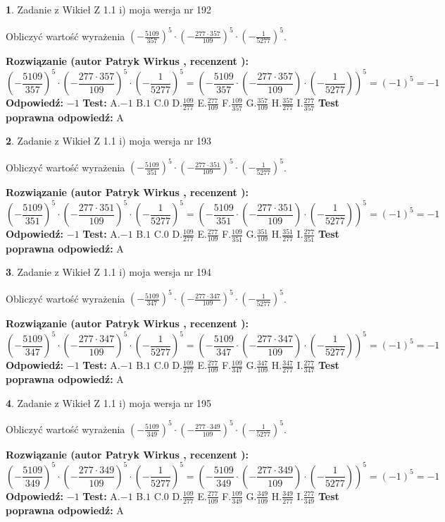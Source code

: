\documentclass[12pt, a4paper]{article}
\theoremstyle{definition} %
\newtheorem{zad}{}
\newcommand{\zadStart}[1]{\begin{zad}#1\newline}
\newcommand{\zadStop}{\end{zad}}
\newcommand{\rozwStart}[2]{\noindent \textbf{Rozwiązanie (autor #1 , recenzent #2): }\newline}
\newcommand{\rozwStop}{\newline}
\newcommand{\odpStart}{\noindent \textbf{Odpowiedź:}\newline}
\newcommand{\odpStop}{\newline}
\newcommand{\testStart}{\noindent \textbf{Test:}\newline}
\newcommand{\testStop}{\newline}
\newcommand{\kluczStart}{\noindent \textbf{Test poprawna odpowiedź:}\newline}
\newcommand{\kluczStop}{\newline}
\begin{document}
\zadStart{Zadanie z Wikieł Z 1.1 i) moja wersja nr 192}

Obliczyć wartość wyrażenia $(-\frac{5109}{357})^{5} \cdot (-\frac{277 \cdot 357}{109})^{5} \cdot (-\frac{1}{5277})^{5}$.
\zadStop
\rozwStart{Patryk Wirkus}{}
$$(-\frac{5109}{357})^{5} \cdot (-\frac{277 \cdot 357}{109})^{5} \cdot (-\frac{1}{5277})^{5} = (-\frac{5109}{357} \cdot (-\frac{277 \cdot 357}{109}) \cdot (-\frac{1}{5277}))^{5} = (-1)^{5} = -1$$
\rozwStop
\odpStart
$-1$
\odpStop
\testStart
A.$-1$ B.$1$ C.$0$ D.$\frac{109}{277}$ E.$\frac{277}{109}$
F.$\frac{109}{357}$ G.$\frac{357}{109}$
H.$\frac{357}{277}$
I.$\frac{277}{357}$
\testStop
\kluczStart
A
\kluczStop



\zadStart{Zadanie z Wikieł Z 1.1 i) moja wersja nr 193}

Obliczyć wartość wyrażenia $(-\frac{5109}{351})^{5} \cdot (-\frac{277 \cdot 351}{109})^{5} \cdot (-\frac{1}{5277})^{5}$.
\zadStop
\rozwStart{Patryk Wirkus}{}
$$(-\frac{5109}{351})^{5} \cdot (-\frac{277 \cdot 351}{109})^{5} \cdot (-\frac{1}{5277})^{5} = (-\frac{5109}{351} \cdot (-\frac{277 \cdot 351}{109}) \cdot (-\frac{1}{5277}))^{5} = (-1)^{5} = -1$$
\rozwStop
\odpStart
$-1$
\odpStop
\testStart
A.$-1$ B.$1$ C.$0$ D.$\frac{109}{277}$ E.$\frac{277}{109}$
F.$\frac{109}{351}$ G.$\frac{351}{109}$
H.$\frac{351}{277}$
I.$\frac{277}{351}$
\testStop
\kluczStart
A
\kluczStop



\zadStart{Zadanie z Wikieł Z 1.1 i) moja wersja nr 194}

Obliczyć wartość wyrażenia $(-\frac{5109}{347})^{5} \cdot (-\frac{277 \cdot 347}{109})^{5} \cdot (-\frac{1}{5277})^{5}$.
\zadStop
\rozwStart{Patryk Wirkus}{}
$$(-\frac{5109}{347})^{5} \cdot (-\frac{277 \cdot 347}{109})^{5} \cdot (-\frac{1}{5277})^{5} = (-\frac{5109}{347} \cdot (-\frac{277 \cdot 347}{109}) \cdot (-\frac{1}{5277}))^{5} = (-1)^{5} = -1$$
\rozwStop
\odpStart
$-1$
\odpStop
\testStart
A.$-1$ B.$1$ C.$0$ D.$\frac{109}{277}$ E.$\frac{277}{109}$
F.$\frac{109}{347}$ G.$\frac{347}{109}$
H.$\frac{347}{277}$
I.$\frac{277}{347}$
\testStop
\kluczStart
A
\kluczStop



\zadStart{Zadanie z Wikieł Z 1.1 i) moja wersja nr 195}

Obliczyć wartość wyrażenia $(-\frac{5109}{349})^{5} \cdot (-\frac{277 \cdot 349}{109})^{5} \cdot (-\frac{1}{5277})^{5}$.
\zadStop
\rozwStart{Patryk Wirkus}{}
$$(-\frac{5109}{349})^{5} \cdot (-\frac{277 \cdot 349}{109})^{5} \cdot (-\frac{1}{5277})^{5} = (-\frac{5109}{349} \cdot (-\frac{277 \cdot 349}{109}) \cdot (-\frac{1}{5277}))^{5} = (-1)^{5} = -1$$
\rozwStop
\odpStart
$-1$
\odpStop
\testStart
A.$-1$ B.$1$ C.$0$ D.$\frac{109}{277}$ E.$\frac{277}{109}$
F.$\frac{109}{349}$ G.$\frac{349}{109}$
H.$\frac{349}{277}$
I.$\frac{277}{349}$
\testStop
\kluczStart
A
\kluczStop
\end{document}

